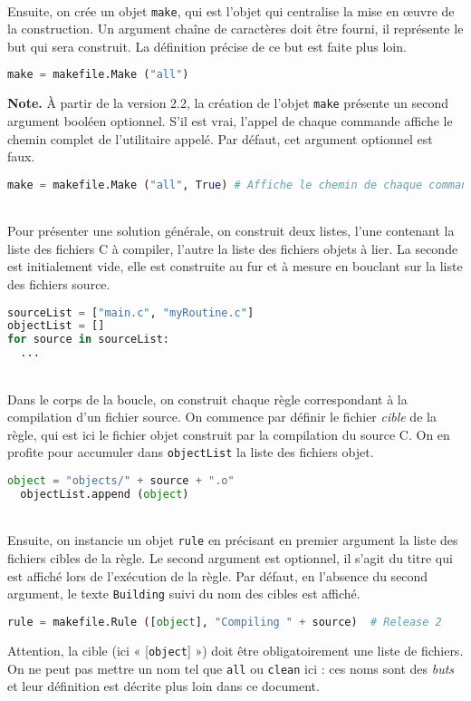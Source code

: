 \documentclass[a4paper,11pt]{extarticle}
\begin{document}
~\\Ensuite, on crée un objet \texttt{make}, qui est l'objet qui centralise la mise en œuvre de la construction. Un argument chaîne de caractères doit être fourni, il représente le but qui sera construit. La définition précise de ce but est faite plus loin.
\begin{lstlisting}[language=py]
make = makefile.Make ("all")
\end{lstlisting}

{\bf Note.}\label{logUtilityToolPath} À partir de la version 2.2, la création de l'objet \texttt{make} présente un second argument booléen optionnel. S'il est vrai, l'appel de chaque commande affiche le chemin complet de l'utilitaire appelé. Par défaut, cet argument optionnel est faux.
\begin{lstlisting}[language=py]
make = makefile.Make ("all", True) # Affiche le chemin de chaque commande appelee
\end{lstlisting}

~\\Pour présenter une solution générale, on construit deux listes, l'une contenant la liste des fichiers C à compiler, l'autre la liste des fichiers objets à lier. La seconde est initialement vide, elle est construite au fur et à mesure en bouclant sur la liste des fichiers source. 
\begin{lstlisting}[language=py]
sourceList = ["main.c", "myRoutine.c"]
objectList = []
for source in sourceList:
  ...
\end{lstlisting}

~\\Dans le corps de la boucle, on construit chaque règle correspondant à la compilation d'un fichier source. On commence par définir le fichier \emph{cible} de la règle, qui est ici le fichier objet construit par la compilation du source C. On en profite pour accumuler dans \texttt{objectList} la liste des fichiers objet.
\begin{lstlisting}[language=py]
  object = "objects/" + source + ".o"
  objectList.append (object)
\end{lstlisting}

~\\Ensuite, on instancie un objet \texttt{rule} en précisant en premier argument la liste des fichiers cibles de la règle. Le second argument est optionnel, il s'agit du titre qui est affiché lors de l'exécution de la règle. Par défaut, en l'absence du second argument, le texte \texttt{Building} suivi du nom des cibles est affiché. 
\begin{lstlisting}[language=py]
  rule = makefile.Rule ([object], "Compiling " + source)  # Release 2
\end{lstlisting}
Attention, la cible (ici « [\texttt{object}] ») doit être obligatoirement une liste de fichiers. On ne peut pas mettre un nom tel que \texttt{all} ou \texttt{clean} ici : ces noms sont des \emph{buts} et leur définition est décrite plus loin dans ce document.
\end{document}
